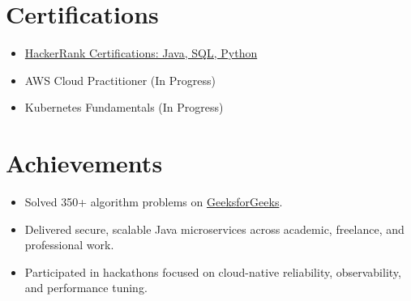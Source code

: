 \documentclass[letterpaper,11pt]{article}
\begin{document}
\section{Certifications}
\begin{itemize}[leftmargin=0.15in,label={},topsep=0pt,noitemsep]
    \item \href{https://www.hackerrank.com/certificates/9eae88324e5d}{HackerRank Certifications: Java, SQL, Python}
    \item AWS Cloud Practitioner (In Progress)
    \item Kubernetes Fundamentals (In Progress)
\end{itemize}

\section{Achievements}
\begin{itemize}[leftmargin=0.15in,label={},topsep=0pt,noitemsep]
    \item Solved 350+ algorithm problems on \href{https://www.geeksforgeeks.org/user/vishal362patel/}{GeeksforGeeks}.
    \item Delivered secure, scalable Java microservices across academic, freelance, and professional work.
    \item Participated in hackathons focused on cloud-native reliability, observability, and performance tuning.
\end{itemize}
\end{document}
